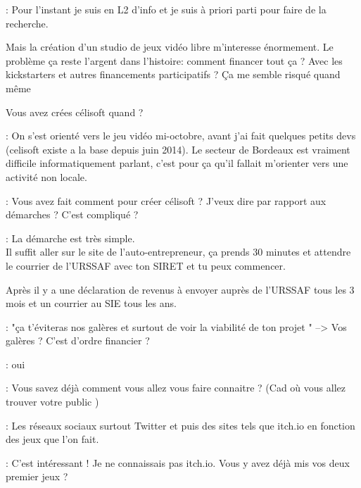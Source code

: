 \documentclass[a4paper,12pt, draft]{report}
\begin{document}
\begin{description}
\item 
\item [Question]: Pour l'instant je suis en L2 d'info et je suis à priori parti pour faire de la recherche.
\item Mais la création d'un studio de jeux vidéo libre m'interesse énormement. Le problème ça reste l'argent dans l'histoire: comment financer tout ça ? Avec les kickstarters et autres financements participatifs ? Ça me semble risqué quand même  
\item 
\item Vous avez crées célisoft quand ?
\item 
\item [Réponse]: On s'est orienté vers le jeu vidéo mi-octobre, avant j'ai fait quelques petits devs (celisoft existe a la base depuis juin 2014). Le secteur de Bordeaux est vraiment difficile informatiquement parlant, c'est pour ça qu'il fallait m'orienter vers une activité non locale.
\item 
\item [Question]: Vous avez fait comment pour créer célisoft ? J'veux dire par rapport aux démarches ? C'est compliqué ?
\item 
\item [Réponse]: La démarche est très simple. \\Il suffit aller sur le site de l'auto-entrepreneur, ça prends 30 minutes et attendre le courrier de l'URSSAF avec ton SIRET et tu peux commencer.
\item Après il y a une déclaration de revenus à envoyer auprès de l'URSSAF tous les 3 mois et un courrier au SIE tous les ans.
\item 
\item [Question]: "ça t'éviteras nos galères et surtout de voir la viabilité de ton projet " --> Vos galères ? C'est d'ordre financier ?
\item 
\item [Réponse]: oui  
\item 
\item [Question]: Vous savez déjà comment vous allez vous faire connaitre ? (Cad où vous allez trouver votre public )
\item 
\item [Réponse]: Les réseaux sociaux surtout Twitter et puis des sites tels que itch.io en fonction des jeux que l'on fait.
\item 
\item [Question]: C'est intéressant ! Je ne connaissais pas itch.io. Vous y avez déjà mis vos deux premier jeux ?

\end{description}
\end{document}
